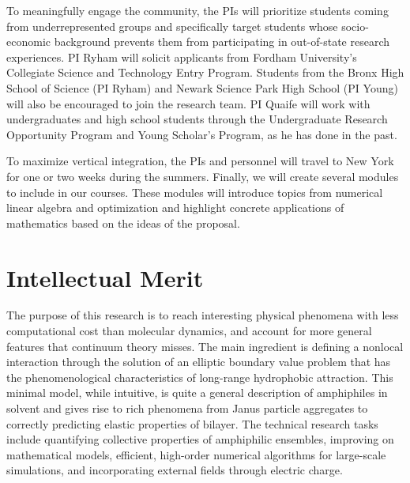 To meaningfully engage the community, the PIs will prioritize students
coming from underrepresented groups and specifically target students
whose socio-economic background prevents them from participating in
out-of-state research experiences.  PI Ryham will solicit applicants
from Fordham University's Collegiate Science and Technology Entry
Program.  Students from the Bronx High School of Science (PI Ryham) and
Newark Science Park High School (PI Young) will also be encouraged to
join the research team. PI Quaife will work with undergraduates and high
school students through the Undergraduate Research Opportunity Program
and Young Scholar's Program, as he has done in the past.

To maximize vertical integration, the PIs and personnel
will travel to New York for one or two weeks during the summers.
Finally, we will create several modules to include in our courses. These
modules will introduce topics from numerical linear algebra and
optimization and highlight concrete applications of mathematics
based on the ideas of the proposal.

\section{Intellectual Merit}
The purpose of this research is to reach interesting physical phenomena with less computational cost than molecular dynamics, and account for more general features that continuum theory misses. The main ingredient is defining a nonlocal interaction through the solution of an elliptic boundary value problem that has the phenomenological characteristics of long-range hydrophobic attraction. This minimal model, while intuitive, is quite a general description of amphiphiles in solvent and gives rise to rich phenomena from Janus particle aggregates to correctly predicting elastic properties of bilayer. The technical research tasks include quantifying collective properties of amphiphilic ensembles, improving on mathematical models, efficient, high-order numerical algorithms for large-scale simulations, and incorporating external fields through electric charge.

